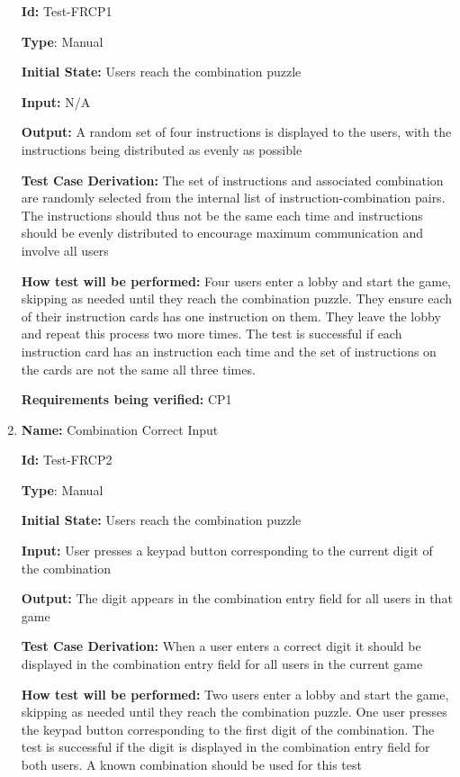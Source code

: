 \documentclass[12pt, titlepage]{article}
\begin{document}
\begin{enumerate}
\textbf{Id:} Test-FRCP1

\textbf{Type}: Manual

\textbf{Initial State:} Users reach the combination puzzle

\textbf{Input:} N/A

\textbf{Output:} A random set of four instructions is displayed to the users, with the instructions being distributed as evenly as possible

\textbf{Test Case Derivation:} The set of instructions and associated combination are randomly selected from the internal list of instruction-combination pairs. The instructions should thus not be the same each time and instructions should be evenly distributed to encourage maximum communication and involve all users

\textbf{How test will be performed:} Four users enter a lobby and start the game, skipping as needed until they reach the combination puzzle. They ensure each of their instruction cards has one instruction on them. They leave the lobby and repeat this process two more times. The test is successful if each instruction card has an instruction each time and the set of instructions on the cards are not the same all three times.

\textbf{Requirements being verified: } CP1

\item{\textbf{Name:} Combination Correct Input} \label{itm:Test-FRCP2}

\textbf{Id:} Test-FRCP2

\textbf{Type}: Manual

\textbf{Initial State:} Users reach the combination puzzle

\textbf{Input:} User presses a keypad button corresponding to the current digit of the combination

\textbf{Output:} The digit appears in the combination entry field for all users in that game

\textbf{Test Case Derivation:} When a user enters a correct digit it should be displayed in the combination entry field for all users in the current game

\textbf{How test will be performed:} Two users enter a lobby and start the game, skipping as needed until they reach the combination puzzle. One user presses the keypad button corresponding to the first digit of the combination. The test is successful if the digit is displayed in the combination entry field for both users. A known combination should be used for this test


\end{enumerate}
\end{document}
